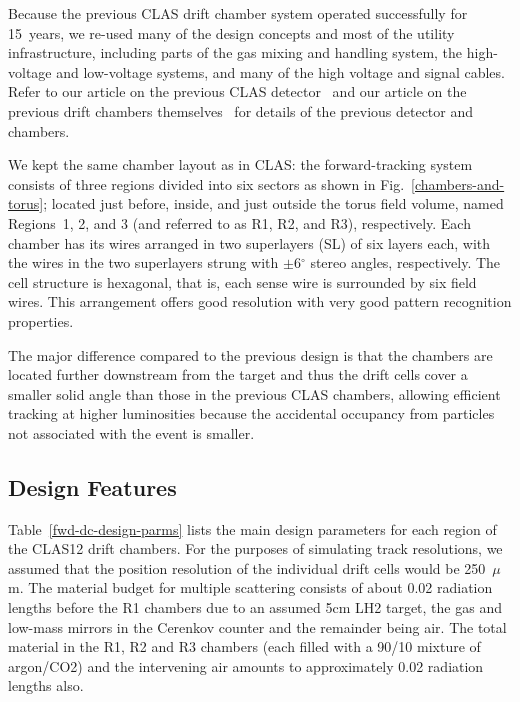 
Because the previous CLAS drift chamber system operated 
successfully for 15~years, we re-used many of the design concepts and 
most of the utility infrastructure, including
parts of the gas mixing and handling system, the high-voltage 
and low-voltage systems, and many of the high voltage and signal cables. 
Refer to our article on the previous CLAS detector~\cite{clasnim} and our article 
on the previous drift chambers themselves~\cite{dcnim} for details of the 
previous detector and chambers.  

We kept the same chamber layout as in CLAS:
the forward-tracking system consists of three regions divided into six
sectors as shown in Fig.~\ref{chambers-and-torus}; located just before, inside, 
and just outside the torus field volume, named Regions~1, 2, 
and 3 (and referred to as R1, R2, and R3), respectively.  
Each chamber has its wires arranged in two superlayers (SL) of
six layers each, with the wires in the two superlayers strung with 
$\pm$6$^\circ$ stereo angles, respectively.  The cell structure is 
hexagonal, that is, each sense wire is surrounded by six field wires.  This 
arrangement offers good resolution with very good pattern recognition properties.  

The major difference compared to the previous design is that the 
chambers are located further downstream from the target and thus the drift
cells cover a smaller solid angle than those in the previous CLAS 
chambers, allowing efficient tracking at higher luminosities because the 
accidental occupancy from particles not associated with the event is smaller.  

\subsection{Design Features}

Table~\ref{fwd-dc-design-parms} lists the main design parameters for each 
region of the CLAS12 drift chambers.  For the purposes of simulating 
track resolutions, we assumed that the position resolution of the individual 
drift cells would be 250~$\mu$m.  The material budget for multiple scattering
consists of about 0.02 radiation lengths before the R1 chambers due to an assumed 5cm LH2
target, the gas and low-mass mirrors in the Cerenkov counter and the remainder being air.
The total material in the R1, R2 and R3 chambers (each filled with a 90/10 mixture
of argon/CO2) and the intervening air amounts to approximately 0.02 radiation lengths also.

